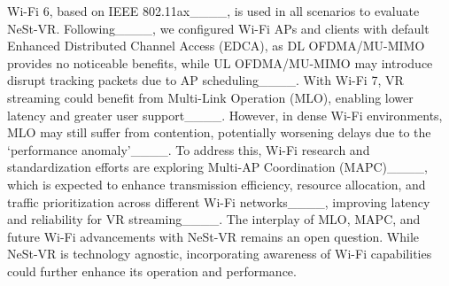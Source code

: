 Wi-Fi 6, based on IEEE 802.11ax____, is used in all scenarios to evaluate NeSt-VR. Following____, we configured Wi-Fi APs and clients with default Enhanced Distributed Channel Access (EDCA), as DL OFDMA/MU-MIMO provides no noticeable benefits, while UL OFDMA/MU-MIMO may introduce disrupt tracking packets due to AP scheduling____. With Wi-Fi 7, VR streaming could benefit from Multi-Link Operation (MLO), enabling lower latency and greater user support____. However, in dense Wi-Fi environments, MLO may still suffer from contention, potentially worsening delays due to the `performance anomaly'____. To address this, Wi-Fi research and standardization efforts are exploring Multi-AP Coordination (MAPC)____, which is expected to enhance transmission efficiency, resource allocation, and traffic prioritization across different Wi-Fi networks____, improving latency and reliability for VR streaming____. The interplay of MLO, MAPC, and future Wi-Fi advancements with NeSt-VR remains an open question. While NeSt-VR is technology agnostic, incorporating awareness of Wi-Fi capabilities could further enhance its operation and performance.


